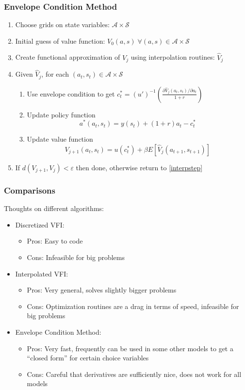 \documentclass[10pt]{beamer}
\begin{document}
\begin{frame} \frametitle{Envelope Condition Method}

  \begin{enumerate}
    \item Choose grids on state variables: $\mathcal{A} \times \mathcal{S}$
    \item Initial guess of value function: $V_0(a, s) \;\forall (a, s) \in \mathcal{A} \times \mathcal{S}$
    \item Create functional approximation of $V_j$ using interpolation routines: $\hat{V}_j$ \label{interpstep}
    \item Given $\hat{V}_j$, for each $(a_t, s_t) \in \mathcal{A} \times \mathcal{S}$
      \begin{enumerate}
        \item Use envelope condition to get $c_t^* = (u')^{-1} \left( \frac{\partial \hat{V}_j(a_t, s_t) / \partial a_t}{1 + r} \right)$
        \item Update policy function $$a^*(a_t, s_t) = y(s_t) + (1+r) a_t - c_t^*$$
        \item Update value function $$V_{j+1}(a_t, s_t) = u(c^*_t) + \beta E \left[\hat{V}_{j}(a_{t+1}, s_{t+1}) \right]$$
      \end{enumerate}
    \item If $d(V_{j+1}, V_j) < \varepsilon$ then done, otherwise return to \ref{interpstep}
  \end{enumerate}

\end{frame}

\begin{frame} \frametitle{Comparisons}

  Thoughts on different algorithms:
  \begin{itemize}
    \item Discretized VFI:
      \begin{itemize}
        \item Pros: Easy to code
        \item Cons: Infeasible for big problems
      \end{itemize}
    \item Interpolated VFI:
      \begin{itemize}
        \item Pros: Very general, solves slightly bigger problems
        \item Cons: Optimization routines are a drag in terms of speed, infeasible for big problems
      \end{itemize}
    \item Envelope Condition Method:
      \begin{itemize}
        \item Pros: Very fast, frequently can be used in some other models to get a ``closed form'' for certain choice variables
        \item Cons: Careful that derivatives are sufficiently nice, does not work for all models
      \end{itemize}
  \end{itemize}

\end{frame}
\end{document}
